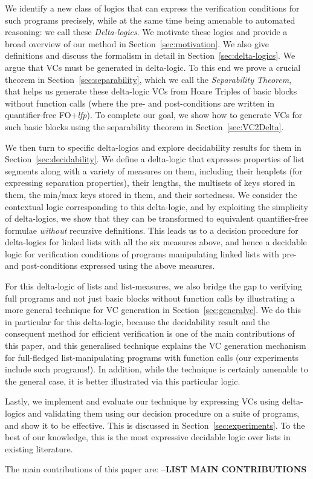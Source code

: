 \documentclass[acmsmall,review,anonymous]{acmart}\settopmatter{printfolios=true,printccs=false,printacmref=false}
\begin{document}
We identify a new class of logics that can express the verification conditions for such programs precisely, while at the same time being amenable to automated reasoning: we call these \emph{Delta-logics}. We motivate these logics and provide a broad overview of our method in Section~\ref{sec:motivation}. We also give definitions and discuss the formalism in detail in Section~\ref{sec:delta-logics}. We argue that VCs must be generated in delta-logic. To this end we prove a crucial theorem in Section~\ref{sec:separability}, which we call the \emph{Separability Theorem}, that helps us generate these delta-logic VCs from Hoare Triples of basic blocks without function calls (where the pre- and post-conditions are written in quantifier-free FO+\textit{lfp}). To complete our goal, we show how to generate VCs for such basic blocks using the separability theorem in Section~\ref{sec:VC2Delta}.
 
We then turn to specific delta-logics and explore decidability results for them in Section~\ref{sec:decidability}. We define a delta-logic that expresses
properties of list segments along with a variety of measures on them, including their heaplets (for expressing separation properties), 
their lengths, the multisets of keys stored in them, the min/max keys stored in them, and their sortedness. We consider the contextual logic
corresponding to this delta-logic, and by exploiting the simplicity of delta-logics, we show that they
can be transformed to equivalent quantifier-free formulae \emph{without} recursive definitions. This
leads us to a decision procedure for delta-logics for linked lists with all the six measures above, and hence a decidable logic
for verification conditions of programs manipulating linked lists with pre- and post-conditions expressed using the above measures.

For this delta-logic of lists and list-measures, we also bridge the gap to verifying full programs and not just basic blocks without function calls by illustrating a more general technique for VC generation in Section~\ref{sec:generalvc}. We do this in particular for this delta-logic, because the decidability result and the consequent method for efficient verification is one of the main contributions of this paper, and this generalised technique explains the VC generation mechanism for full-fledged list-manipulating programs with function calls (our experiments include such programs!). In addition, while the technique is certainly amenable to the general case, it is better illustrated via this particular logic.

Lastly, we implement and evaluate our technique by expressing VCs using delta-logics and validating them using our decision procedure
on a suite of programs, and show it to be effective. This is discussed in Section~\ref{sec:experiments}.
To the best of our knowledge, this is the most expressive decidable logic over lists in existing literature. 


The main contributions of this paper are:
--\textbf{LIST MAIN CONTRIBUTIONS}
\end{document}
